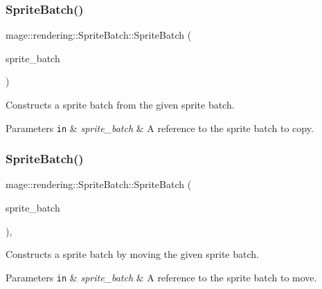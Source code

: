 \subsubsection{\texorpdfstring{Sprite\+Batch()}{SpriteBatch()}\hspace{0.1cm}{\footnotesize\ttfamily [2/3]}}
{\footnotesize\ttfamily mage\+::rendering\+::\+Sprite\+Batch\+::\+Sprite\+Batch (\begin{DoxyParamCaption}\item[{const \mbox{\hyperlink{classmage_1_1rendering_1_1_sprite_batch}{Sprite\+Batch}} \&}]{sprite\+\_\+batch }\end{DoxyParamCaption})\hspace{0.3cm}{\ttfamily [delete]}}

Constructs a sprite batch from the given sprite batch.


\begin{DoxyParams}[1]{Parameters}
\mbox{\tt in}  & {\em sprite\+\_\+batch} & A reference to the sprite batch to copy. \\
\hline
\end{DoxyParams}
\mbox{\label{classmage_1_1rendering_1_1_sprite_batch_a91644c1c0c3e53a87f470116ec9746dc}} 
\subsubsection{\texorpdfstring{Sprite\+Batch()}{SpriteBatch()}\hspace{0.1cm}{\footnotesize\ttfamily [3/3]}}
{\footnotesize\ttfamily mage\+::rendering\+::\+Sprite\+Batch\+::\+Sprite\+Batch (\begin{DoxyParamCaption}\item[{\mbox{\hyperlink{classmage_1_1rendering_1_1_sprite_batch}{Sprite\+Batch}} \&\&}]{sprite\+\_\+batch }\end{DoxyParamCaption})\hspace{0.3cm}{\ttfamily [default]}, {\ttfamily [noexcept]}}

Constructs a sprite batch by moving the given sprite batch.


\begin{DoxyParams}[1]{Parameters}
\mbox{\tt in}  & {\em sprite\+\_\+batch} & A reference to the sprite batch to move. \\
\hline
\end{DoxyParams}
\mbox{\label{classmage_1_1rendering_1_1_sprite_batch_aedb2831f0054cedb1ede8be8f27e0432}} 
